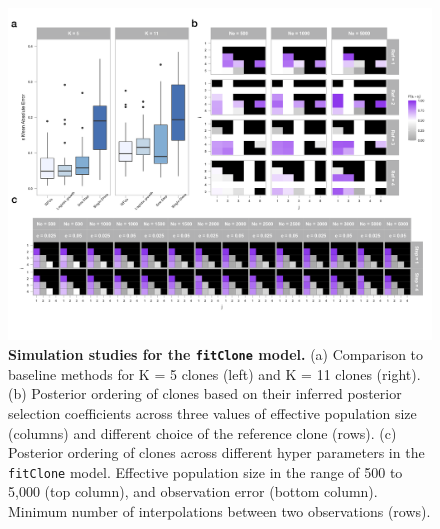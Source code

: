 \begin{figure}
\centering
  \includegraphics[width=\textwidth]{Figures/simulationspdx.png}
	
\caption[Simulation studies for the \texttt{fitClone} model]
	{\small
	\textbf{Simulation studies for the \texttt{fitClone} model.}
	  (a) Comparison to baseline methods for K = 5 clones (left) and K = 11 clones (right). (b) Posterior ordering of clones based on their inferred posterior selection coefficients across three values of effective population size (columns) and different choice of the reference clone (rows). (c) Posterior ordering of clones across different hyper parameters in the \texttt{fitClone} model. Effective population size in the range of 500 to 5,000 (top column), and observation error (bottom column). Minimum number of interpolations between two observations (rows).}
\label{fig:simulations}
\end{figure}





